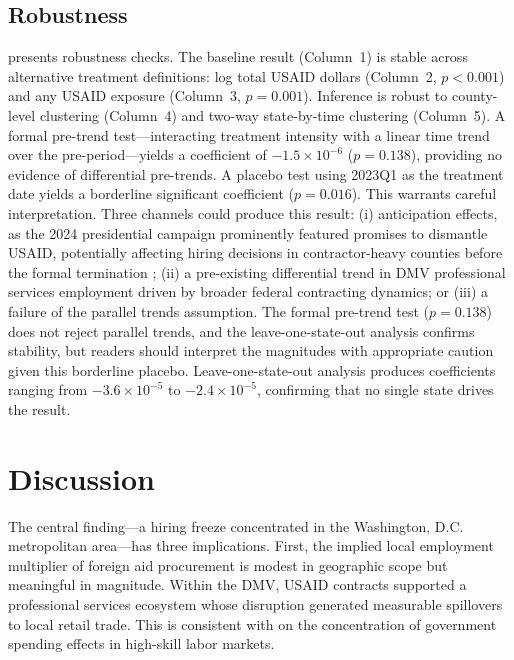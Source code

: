 \documentclass[12pt]{article}
\begin{document}
\subsection{Robustness}

{\small}

 presents robustness checks. The baseline result (Column~1) is stable across alternative treatment definitions: log total USAID dollars (Column~2, $p < 0.001$) and any USAID exposure (Column~3, $p = 0.001$). Inference is robust to county-level clustering (Column~4) and two-way state-by-time clustering (Column~5). A formal pre-trend test---interacting treatment intensity with a linear time trend over the pre-period---yields a coefficient of $-1.5 \times 10^{-6}$ ($p = 0.138$), providing no evidence of differential pre-trends. A placebo test using 2023Q1 as the treatment date yields a borderline significant coefficient ($p = 0.016$). This warrants careful interpretation. Three channels could produce this result: (i) anticipation effects, as the 2024 presidential campaign prominently featured promises to dismantle USAID, potentially affecting hiring decisions in contractor-heavy counties before the formal termination \citep{suarez2016did}; (ii) a pre-existing differential trend in DMV professional services employment driven by broader federal contracting dynamics; or (iii) a failure of the parallel trends assumption. The formal pre-trend test ($p = 0.138$) does not reject parallel trends, and the leave-one-state-out analysis confirms stability, but readers should interpret the magnitudes with appropriate caution given this borderline placebo. Leave-one-state-out analysis produces coefficients ranging from $-3.6 \times 10^{-5}$ to $-2.4 \times 10^{-5}$, confirming that no single state drives the result.

\section{Discussion}
\label{sec:discussion}

The central finding---a hiring freeze concentrated in the Washington, D.C. metropolitan area---has three implications. First, the implied local employment multiplier of foreign aid procurement is modest in geographic scope but meaningful in magnitude. Within the DMV, USAID contracts supported a professional services ecosystem whose disruption generated measurable spillovers to local retail trade. This is consistent with \citet{moretti2010local} on the concentration of government spending effects in high-skill labor markets.
\end{document}
